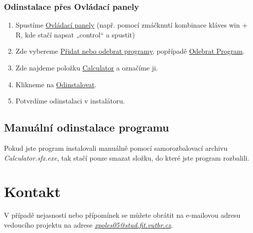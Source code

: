 \documentclass[11pt,a4paper,titlepage]{article}
\begin{document}
\subsubsection{Odinstalace přes Ovládací panely}
\begin{enumerate}
  \item Spustíme \underline{Ovládací panely} (např. pomocí zmáčknutí kombinace kláves win + R, kde stačí napsat „control“ a spustit)
  \item Zde vybereme \underline{Přidat nebo odebrat programy}, popřípadě \underline{Odebrat Program}.
  \item Zde najdeme položku \underline{Calculator} a označíme ji.
  \item Klikneme na \underline{Odinstalovat}.
  \item Potvrdíme odinstalaci v instalátoru.
  \end{enumerate}
\subsection{Manuální odinstalace programu}
Pokud jste program instalovali manuálně pomocí samorozbalovací archivu \emph{Calculator.sfx.exe}, tak stačí pouze smazat složku, do které jste program rozbalili.
\section{Kontakt}
V případě nejasností nebo přípomínek se můžete obrátit na e-mailovou adresu vedoucího projektu na adrese \emph{\href{mailto:xpoles05@stud.fit.vutbr.cz}{xpoles05@stud.fit.vutbr.cz}}.
\end{document}
